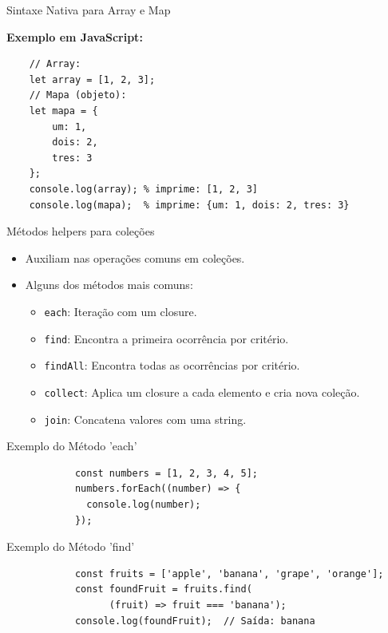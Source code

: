\documentclass{beamer}
\begin{document}
\begin{frame}[fragile]{Sintaxe Nativa para Array e Map}

	\textbf{Exemplo em JavaScript:}
	\begin{verbatim}
    // Array:
    let array = [1, 2, 3];
    // Mapa (objeto):
    let mapa = {
        um: 1,
        dois: 2,
        tres: 3
    };
    console.log(array); % imprime: [1, 2, 3]
    console.log(mapa);  % imprime: {um: 1, dois: 2, tres: 3}
      \end{verbatim}
\end{frame}
\begin{frame}{Métodos helpers para coleções}\justifying
	\begin{itemize}
		\item Auxiliam nas operações comuns em coleções.
		\item Alguns dos métodos mais comuns:
		      \begin{itemize}
			      \item \texttt{each}: Iteração com um closure.
			      \item \texttt{find}: Encontra a primeira ocorrência por critério.
			      \item \texttt{findAll}: Encontra todas as ocorrências por critério.
			      \item \texttt{collect}: Aplica um closure a cada elemento e cria nova coleção.
			      \item \texttt{join}: Concatena valores com uma string.
		      \end{itemize}
	\end{itemize}
\end{frame}
\begin{frame}[fragile]{Exemplo do Método 'each'}
	\begin{verbatim}
            const numbers = [1, 2, 3, 4, 5];
            numbers.forEach((number) => {
              console.log(number);
            });
            \end{verbatim}
\end{frame}

\begin{frame}[fragile]{Exemplo do Método 'find'}
	\begin{verbatim}
            const fruits = ['apple', 'banana', 'grape', 'orange'];
            const foundFruit = fruits.find(
                  (fruit) => fruit === 'banana');
            console.log(foundFruit);  // Saída: banana
            \end{verbatim}
\end{frame}
\end{document}
